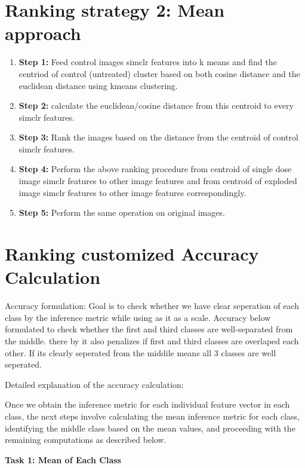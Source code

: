 \section{Ranking strategy 2: Mean approach}

\begin{enumerate}
  \item \textbf{Step 1:} Feed control images simclr features into k means and find the centriod of control (untreated) cluster based on both cosine distance and the euclidean distance using kmeans clustering. 
 
  
  \item \textbf{Step 2:} calculate the euclidean/cosine distance from this centroid to every simclr features.
  \item \textbf{Step 3:} Rank the images based on the distance from the centroid of control simclr features.
  \item \textbf{Step 4:} Perform the above ranking procedure from centroid of single dose image simclr features to other image features and from centroid of exploded image simclr features to other image features correspondingly.
  
  \item \textbf{Step 5:} Perform the same operation  on original images.
\end{enumerate}


\section*{Ranking customized Accuracy Calculation}

Accuracy formulation: Goal is to check whether we have clear seperation of each class by the inference metric while using as it as a scale. Accuracy below formulated to check whether the first and third classes are well-separated from the middle. there by it also penalizes if first and third classes are overlaped each other. If its clearly seperated from the middile means all 3 classes  are well seperated. 

Detailed explanation of the accuracy calculation:

Once we obtain the inference metric for each individual feature vector in each class, the next steps involve calculating the mean inference metric for each class, identifying the middle class based on the mean values, and proceeding with the remaining computations as described below.

\textbf{Task 1: Mean of Each Class}

